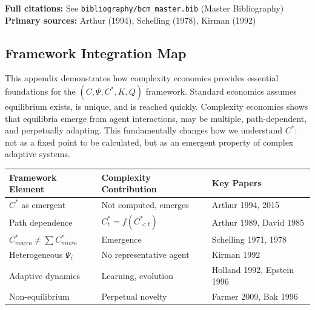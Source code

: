 \noindent\textbf{Full citations:} See \texttt{bibliography/bcm\_master.bib} (Master Bibliography) \\
\textbf{Primary sources:} Arthur (1994), Schelling (1978), Kirman (1992)

\vspace{1em}

\subsection{Framework Integration Map}

This appendix demonstrates how complexity economics provides essential 
foundations for the $(C, \Psi, C^*, K, Q)$ framework. Standard economics 
assumes equilibrium exists, is unique, and is reached quickly. Complexity 
economics shows that equilibria emerge from agent interactions, may be 
multiple, path-dependent, and perpetually adapting. This fundamentally 
changes how we understand $C^*$: not as a fixed point to be calculated, 
but as an emergent property of complex adaptive systems.

\begin{center}
\renewcommand{\arraystretch}{1.4}
\begin{tabular}{|l|l|l|}
\hline
\textbf{Framework Element} & \textbf{Complexity Contribution} & \textbf{Key Papers} \\
\hline
$C^*$ as emergent & Not computed, emerges & Arthur 1994, 2015 \\
Path dependence & $C^*_t = f(C^*_{<t})$ & Arthur 1989, David 1985 \\
$C^*_{macro} \neq \sum C^*_{micro}$ & Emergence & Schelling 1971, 1978 \\
Heterogeneous $\Psi_i$ & No representative agent & Kirman 1992 \\
Adaptive dynamics & Learning, evolution & Holland 1992, Epstein 1996 \\
Non-equilibrium & Perpetual novelty & Farmer 2009, Bak 1996 \\
\hline
\end{tabular}
\end{center}

